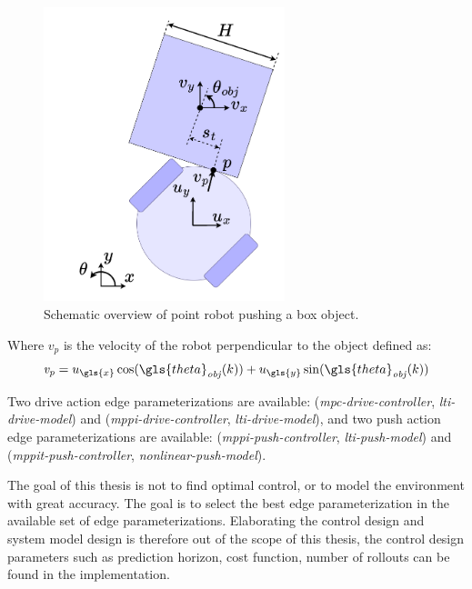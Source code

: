 \begin{figure}[H]
    \centering
    \includegraphics[width=7cm]{figures/results/robot_and_square_object.drawio}
    \caption{Schematic overview of point robot pushing a box object.}%
    \label{fig:robot_and_square_object}
\end{figure}

Where $v_p$ is the velocity of the robot perpendicular to the object defined as:\bs
\[ \mathit{v_p} = u_{\gls{x}} \cos(\gls{theta}_{\mathit{obj}}(k)) + u_{\gls{y}}\sin(\gls{theta}_{\mathit{obj}}(k)) \]

Two drive action edge parameterizations are available: (\textit{mpc-drive-controller}, \textit{lti-drive-model}) and (\textit{mppi-drive-controller}, \textit{lti-drive-model}), and two push action edge parameterizations are available: (\textit{mppi-push-controller}, \textit{lti-push-model}) and (\textit{mppit-push-controller}, \textit{nonlinear-push-model}).\bs

The goal of this thesis is not to find optimal control, or to model the environment with great accuracy. The goal is to select the best edge parameterization in the available set of edge parameterizations. Elaborating the control design and system model design is therefore out of the scope of this thesis, the control design parameters such as prediction horizon, cost function, number of rollouts can be found in the implementation.\bs

